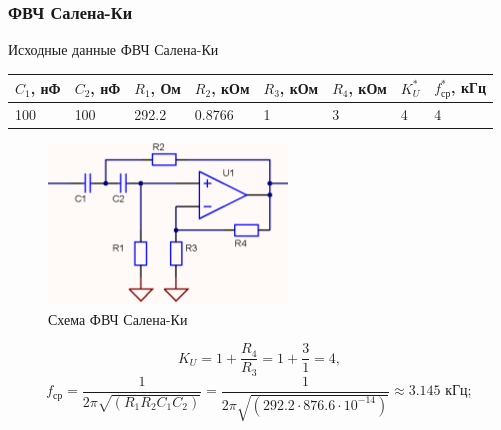 \documentclass[a4paper, 12pt]{article}
\begin{document}
    \subsubsection{ФВЧ Салена-Ки} \label{sec:hpsk}
    Исходные данные ФВЧ Салена-Ки
    \begin{center}
        \begin{tabular}{ | m{3.5em} | m{3.5em}| m{3.5em} | m{4em} | m{4em} | m{4em} | m{2.5em} | m{3.5em} |} 
        \hline
        $C_1$, нФ&$C_2$, нФ&$R_1$, Ом&$R_2$, кОм&$R_3$, кОм&$R_4$, кОм&$K_U^*$&$f_\text{ср}^*$, кГц\\ 
        \hline
        100&100&292.2&0.8766&1&3&4&4\\ 
        \hline
        \end{tabular}
    \end{center}
    \begin{figure}[H]
        \centering
        \includegraphics{high_pass_sk.png}
        \captionsetup{skip=0pt}
        \caption{Схема ФВЧ Салена-Ки}
        \label{fig:null_scheme3}
    \end{figure}
    $$
    K_U=1+\dfrac{R_4}{R_3}=1+\dfrac{3}{1}=4,
    $$
    $$
    f_\text{ср}=\dfrac{1}{2\pi\sqrt{\left( R_1R_2C_1C_2 \right)}}=\dfrac{1}{2\pi\sqrt{\left( 292.2\cdot876.6\cdot10^{-14} \right)}}\approx3.145\text{ кГц};
    $$
\end{document}
